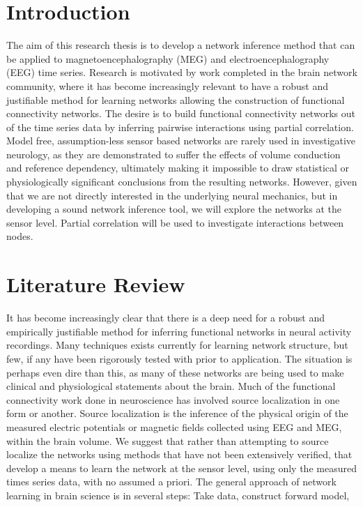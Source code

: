 \documentclass[11pt]{article}
\begin{document}
\section{Introduction}
The aim of this research thesis is to develop a network inference method that can be applied to magnetoencephalography (MEG) and electroencephalography (EEG) time series. Research is motivated by work completed in the brain network community, where it has become increasingly relevant to have a robust and justifiable method for learning networks allowing the construction of functional connectivity networks. The desire is to build functional connectivity networks out of the time series data by inferring pairwise interactions using partial correlation. Model free, assumption-less sensor based networks are rarely used in investigative neurology, as they are demonstrated to suffer the effects of volume conduction and reference dependency, ultimately making it impossible to draw statistical or physiologically significant conclusions from the resulting networks. However, given that we are not directly interested in the underlying neural mechanics, but in developing a sound network inference tool, we will explore the networks at the sensor level. Partial correlation will be used to investigate interactions between nodes. 


\section{Literature Review}
It has become increasingly clear that there is a deep need for a robust and empirically justifiable method for inferring functional networks in neural activity recordings. Many techniques exists currently for learning network structure, but few, if any have been rigorously tested with prior to application. The situation is perhaps even dire than this, as many of these networks are being used to make clinical and physiological statements about the brain. Much of the functional connectivity work done in neuroscience has involved source localization in one form or another. Source localization is the inference of the physical origin of the measured electric potentials or magnetic fields collected using EEG and MEG, within the brain volume. We suggest that rather than attempting to source localize the networks using methods that have not been extensively verified, that develop a means to learn the network at the sensor level, using only the measured times series data, with no assumed a priori. The general approach of network learning in brain science is in several steps: Take data, construct forward model, 
\end{document}

